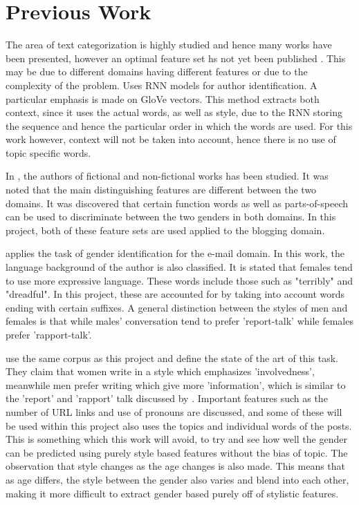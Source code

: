 \section{Previous Work}
The area of text categorization is highly studied and hence many works have been presented, however an optimal feature set hs not yet been published \cite{1}. This may be due to different domains having different features or due to the complexity of the problem. \cite{1} Uses RNN models for author identification. A particular emphasis is made on GloVe vectors. This method extracts both context, since it uses the actual words, as well as style, due to the RNN storing the sequence and hence the particular order in which the words are used. For this work however, context will not be taken into account, hence there is no use of topic specific words.

In \cite{3}, the authors of fictional and non-fictional works has been studied. It was noted that the main distinguishing features are different between the two domains. It was discovered that certain function words as well as parts-of-speech can be used to discriminate between the two genders in both domains. In this project, both of these feature sets are used applied to the blogging domain.

\cite{4} applies the task of gender identification for the e-mail domain. In this work, the language background of the author is also classified. It is stated that females tend to use more expressive language. These words include those such as "terribly" and "dreadful". In this project, these are accounted for by taking into account words ending with certain suffixes. A general distinction between the styles of men and females is that while males' conversation tend to prefer 'report-talk' while females prefer 'rapport-talk'.

\cite{2} use the same corpus as this project and define the state of the art of this task. They claim that women write in a style which emphasizes 'involvedness', meanwhile men prefer writing which give more 'information', which is similar to the 'report' and 'rapport' talk discussed by \cite{4}. Important features such as the number of URL links and use of pronouns are discussed, and some of these will be used within this project \cite{2} also uses the topics and individual words of the posts. This is something which this work will avoid, to try and see how well the gender can be predicted using purely style based features without the bias of topic. The observation that style changes as the age changes is also made. This means that as age differs, the style between the gender also varies and blend into each other, making it more difficult to extract gender based purely off of stylistic features.